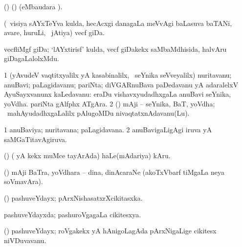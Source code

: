 {{{{\bentry
{} 
\gl{\nA}
\expl{}
\bmng
 (\ame) (\AmA)  (eMbaudara \saMkiSx). 
\emng
\eentry

\bentry
{} 
\gl{\nA}
\expl{}
\bmng
 (\kanmu\ visiya sAYxTeYva kulda, hecAcxgi danagaLa meVvAgi baLasuva baTANi, avare, huruLi, \mo\ jAtiya) vecf giDa. 
\emng
\eentry

\bentry
{} 
\gl{\nA}
\expl{}
\bmng
 vecfliMgf giDa; `lAYxtirisf' kulda, vecf giDakekx saMbaMdhisida, halvAru giDagaLalolxMdu. 
\emng
\eentry

\bentry
{} 
\gl{\nA}
\expl{}
\bmng
\bnum
\num{1} (yAvudeV vaqtitxyalilx yA kasabinalilx, \kanmu\ seYnika seVveyalilx) nuritavanu; anuBavi; paLagidavanu; pariNta; diVGARnuBava paDedavanu yA adaralelxV AyuSayxvanunx kaLedavanu:  eraDu vishavxyudadhxgaLa anuBavi seYnika, yoVdha.  pariNta gAlfphx ATgAra. 
\num{2} (\ame) mAji -- seYnika, BaT, yoVdha; \kanmu\ mahAyudadhxgaLalilx pAlugoMDu nivaqtatxnAdavanu(Lu). 
\enum
\emng
\eentry

\bentry
{} 
\gl{\gu}
\expl{}
\bmng
\bnum
\num{1} anuBaviya; nuritavana; paLagidavana. 
\num{2} anuBavigaLigAgi iruva yA saMGaTitavAgiruva. 
\enum
\emng
\eentry

\bentry
{}
\gl{\nA}
\expl{}
\bmng
 (\birx) ( yA kekx muMce tayArAda) haLe(mAdariya) kAru. 
\emng
\eentry

\bentry
{}
\gl{\nA}
\expl{}
\bmng
 (\ame) mAji BaTra, yoVdhara -- dina, dinAcaraNe (akoTxVbarf tiMgaLa neya soVmavAra). 
\emng
\eentry

\bentry
{} 
\gl{\nA}
\expl{}
\bmng
 (\ame) pashuveYdayx; pArxNishasatxrXcikitasxka. 
\emng
\eentry

\bentry
{} 
\gl{\gu}
\expl{}
\bmng
 pashuveYdayxda; pashuroVgagaLa cikitesxya. 
\emng
\eentry

\bentry
{} 
\gl{\nA}
\bmng
\emng
\eentry

\bentry
{}
\gl{\nA}
\expl{}
\bmng
 (\birx) pashuveYdayx; roVgakekx yA hAnigoLagAda pArxNigaLige cikitesx niVDuvavanu. 
\emng
\eentry

}}}}
